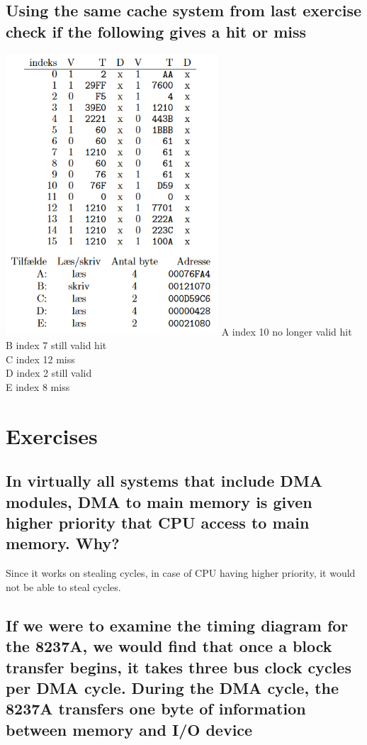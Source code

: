 \documentclass[12pt, a4paper]{article}
\begin{document}
		\subsection{Using the same cache system from last exercise check if the following gives a hit or miss}
			\includegraphics[width=300px]{assets/cacheHistory.png}
			A index 10 no longer valid hit\\
			B index 7 still valid hit\\
			C index 12 miss\\
			D index 2 still valid\\
			E index 8 miss
	\section{Exercises}
		\subsection{In virtually all systems that include DMA modules, DMA to main memory is given higher priority that CPU access to main memory. Why?}			
			Since it works on stealing cycles, in case of CPU having higher priority, it would not be able to steal cycles.
		\subsection{If we were to examine the timing diagram for the 8237A, we would find that once a block transfer begins, it takes three bus clock cycles per DMA cycle. During the DMA cycle, the 8237A transfers one byte of information between memory and I/O device}
\end{document}
